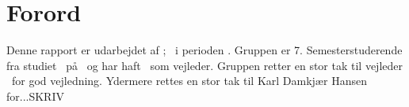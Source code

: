 \chapter*{Forord}
\label{Forord}
Denne rapport er udarbejdet af \groupname; \groupmembers\ i perioden \projectperiod. Gruppen er 7. Semesterstuderende fra studiet \studyname\ på \universityname\ og har haft \supervisor\ som vejleder. Gruppen retter en stor tak til vejleder \supervisor\ for god vejledning. Ydermere rettes en stor tak til Karl Damkjær Hansen for...SKRIV
%
